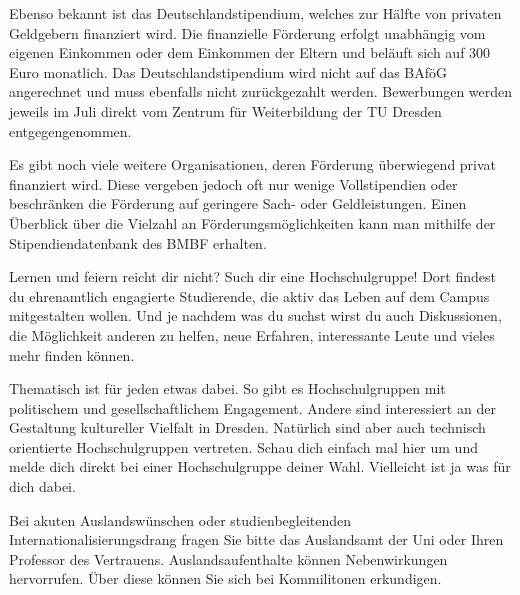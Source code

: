 Ebenso bekannt ist das Deutschlandstipendium, welches zur Hälfte von privaten Geldgebern finanziert wird.
Die finanzielle Förderung erfolgt unabhängig vom eigenen Einkommen oder dem Einkommen der Eltern und beläuft sich auf 300 Euro monatlich.
Das Deutschlandstipendium wird nicht auf das BAföG angerechnet und muss ebenfalls nicht zurückgezahlt werden.
Bewerbungen werden jeweils im Juli direkt vom Zentrum für Weiterbildung der TU Dresden  entgegengenommen.

Es gibt noch viele weitere Organisationen, deren Förderung überwiegend privat finanziert wird. Diese vergeben jedoch oft nur wenige Vollstipendien oder beschränken die Förderung auf geringere Sach- oder Geldleistungen.
Einen Überblick über die Vielzahl an Förderungsmöglichkeiten kann man mithilfe der Stipendiendatenbank des BMBF  erhalten.



Lernen und feiern reicht dir nicht? 
Such dir eine Hochschulgruppe!
Dort findest du ehrenamtlich engagierte Studierende, die aktiv das Leben auf
dem Campus mitgestalten wollen.
Und je nachdem was du suchst wirst du auch Diskussionen, die Möglichkeit anderen zu helfen, neue Erfahren, interessante Leute und vieles mehr finden können.

Thematisch ist für jeden etwas dabei. 
So gibt es Hochschulgruppen mit politischem und gesellschaftlichem Engagement. 
Andere sind interessiert an der Gestaltung kultureller Vielfalt in Dresden. 
Natürlich sind aber auch technisch orientierte Hochschulgruppen vertreten.
Schau dich einfach mal hier  um und melde dich direkt bei einer Hochschulgruppe deiner Wahl. 
Vielleicht ist ja was für dich dabei.

\newpage
{}

Bei akuten Auslandswünschen oder studienbegleitenden Internationalisierungsdrang fragen Sie bitte das Auslandsamt der Uni oder Ihren Professor des Vertrauens. 
Auslandsaufenthalte können Nebenwirkungen hervorrufen. 
Über diese können Sie sich bei Kommilitonen erkundigen.

